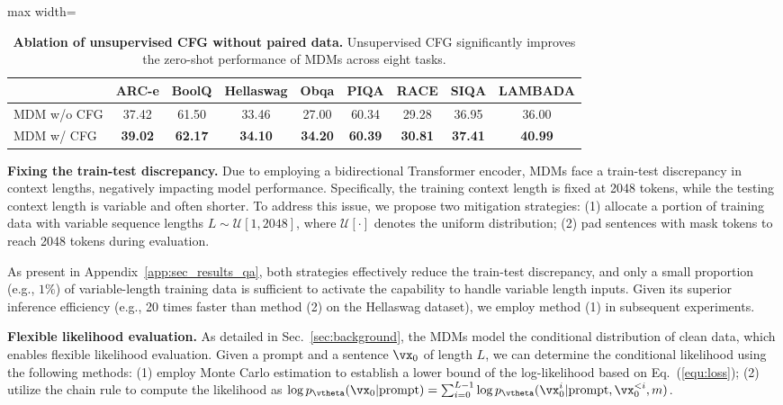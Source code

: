 \documentclass{article} %
\begin{document}
\begin{table}[t!]
    \centering
    \caption{\textbf{Ablation of unsupervised CFG without paired data.} Unsupervised CFG  significantly improves the zero-shot performance of MDMs across eight tasks. }
    \label{tab:cfg_qa}
    \begin{adjustbox}{max width=\textwidth}
    \begin{tabular}{lcccccccc}
      \toprule
         & ARC-e & BoolQ & Hellaswag &  Obqa &  PIQA & RACE & SIQA  & LAMBADA \\
      \midrule
        MDM w/o CFG & 37.42 & 61.50 & 33.46 & 27.00& 60.34 & 29.28 & 36.95 & 36.00\\
       \midrule
       MDM w/ CFG & \textbf{39.02} & \textbf{62.17} & \textbf{34.10} & \textbf{34.20} & \textbf{60.39} & \textbf{30.81} & \textbf{37.41} & \textbf{40.99} \\
      \bottomrule
    \end{tabular}
    \end{adjustbox}
\end{table}


\textbf{Fixing the train-test discrepancy.} Due to employing a bidirectional Transformer encoder, MDMs face a train-test discrepancy in context lengths, negatively impacting model performance. Specifically, the training context length is fixed at 2048 tokens, while the testing context length is variable and often shorter. To address this issue, we propose two mitigation strategies: (1) allocate a portion of training data with variable sequence lengths $L \sim \mathcal{U}[1, 2048]$, where $\mathcal{U}[\cdot]$ denotes the uniform distribution; (2) pad sentences with mask tokens to reach 2048 tokens during evaluation.

As present in Appendix~\ref{app:sec_results_qa}, both strategies effectively reduce the train-test discrepancy, and only a small proportion (e.g., $1\%$) of variable-length training data is sufficient to activate the capability to handle variable length inputs. Given its superior inference efficiency (e.g., 20 times faster than method (2) on the Hellaswag dataset), we employ method (1) in subsequent experiments.

\textbf{Flexible likelihood evaluation.} As detailed in Sec.~\ref{sec:background}, the MDMs model the conditional distribution of clean data, which enables flexible likelihood evaluation. Given a prompt and a sentence $\vx_0$ of length $L$, we can determine the conditional likelihood using the following methods: (1) employ Monte Carlo estimation to establish a lower bound of the log-likelihood based on Eq.~(\ref{equ:loss}); (2) utilize the chain rule to compute the likelihood as $\log p_{\vtheta}(\vx_0|\text{prompt}) = \sum_{i=0}^{L-1} \log p_{\vtheta}(\vx_0^i|\text{prompt}, \vx_0^{<i}, m)$.
\end{document}
